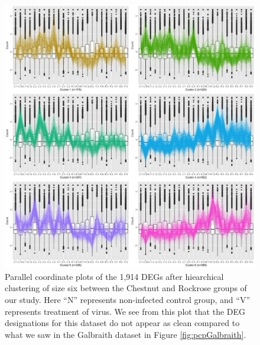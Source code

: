 \documentclass[11pt,a4paper,oldfontcommands,openany]{memoir}
\numberwithin{equation}{section} %
\begin{document}
\begin{figure}[H]
\begin{framed}
  \includegraphics[width=\textwidth]{Images/C_R_6.jpg}
\end{framed}
  \caption{Parallel coordinate plots of the 1,914 DEGs after hiearchical clustering of size six between the Chestnut and Rockrose groups of our study. Here ``N'' represents non-infected control group, and ``V'' represents treatment of virus. We see from this plot that the DEG designations for this dataset do not appear as clean compared to what we saw in the Galbraith dataset in Figure \ref{fig:pcpGalbraith}.}
  \label{fig:pcpRutterDiet}
\end{figure}
\end{document}
